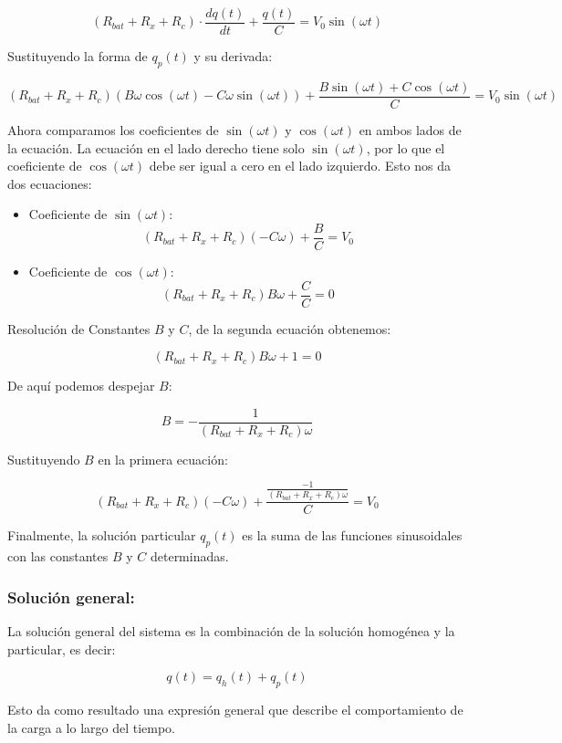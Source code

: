\[
    (R_{bat} + R_x + R_c) \cdot \frac{dq(t)}{dt} + \frac{q(t)}{C} = V_0 \sin(\omega t)
\]

Sustituyendo la forma de \( q_p(t) \) y su derivada:

\[
    (R_{bat} + R_x + R_c)(B\omega \cos(\omega t) - C\omega \sin(\omega t)) + \frac{B \sin(\omega t) + C \cos(\omega t)}{C} = V_0 \sin(\omega t)
\]

Ahora comparamos los coeficientes de \( \sin(\omega t) \) y \( \cos(\omega t) \) en ambos lados de la ecuación. La
ecuación en el lado derecho tiene solo \( \sin(\omega t) \), por lo que el coeficiente de \( \cos(\omega t) \) debe ser
igual a cero en el lado izquierdo. Esto nos da dos ecuaciones:

\begin{itemize}
    \item Coeficiente de \( \sin(\omega t) \):
          \[
              (R_{bat} + R_x + R_c)(-C\omega) + \frac{B}{C} = V_0
          \]

    \item Coeficiente de \( \cos(\omega t) \):
          \[
              (R_{bat} + R_x + R_c) B\omega + \frac{C}{C} = 0
          \]
\end{itemize}

Resolución de Constantes \( B \) y \( C \), de la segunda ecuación obtenemos:

\[
    (R_{bat} + R_x + R_c) B\omega + 1 = 0
\]

De aquí podemos despejar \( B \):

\[
    B = -\frac{1}{(R_{bat} + R_x + R_c) \omega}
\]

Sustituyendo \( B \) en la primera ecuación:

\[
    (R_{bat} + R_x + R_c)(-C\omega) +  \frac{\frac{-1}{(R_{bat} + R_x + R_c) \omega}}{C}  = V_0
\]

Finalmente, la solución particular \( q_p(t) \) es la suma de las funciones sinusoidales con las
constantes \( B \) y \( C \) determinadas.

\subsubsection*{Solución general:}
La solución general del sistema es la combinación de la solución homogénea y la particular,
es decir:

\[
    q(t) = q_h(t) + q_p(t)
\]

Esto da como resultado una expresión general que describe el comportamiento de la carga a lo
largo del tiempo.

